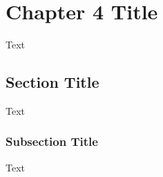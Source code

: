 \chapter{Chapter 4 Title}\label{chap4}
Text

\section{Section Title}  %
Text

\subsection{Subsection Title} %
Text